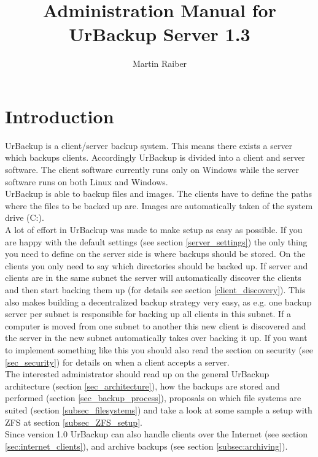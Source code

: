 \documentclass[a4paper,10pt]{article}
\begin{document}

\author{Martin Raiber}
\title{Administration Manual for\\UrBackup Server 1.3}

\maketitle

\tableofcontents

\section{Introduction}

UrBackup is a client/server backup system. This means there exists a server
which backups clients. Accordingly UrBackup is divided into a client and server
software. The client software currently runs only on Windows while the server
software runs on both Linux and Windows.\\
UrBackup is able to backup files and images. The clients have to define the
paths where the files to be backed up are. Images are automatically taken of the
system drive (C:).\\
A lot of effort in UrBackup was made to make setup as easy as possible. If you
are happy with the default settings (see section \ref{server_settings}) the only
thing you need to define on the server side is where backups should be stored.
On the clients you only need to say which directories should be backed up. If
server and clients are in the same subnet the server will automatically discover
the clients and then start backing them up (for details see section
\ref{client_discovery}). This also makes building a decentralized backup
strategy very easy, as e.g. one backup server per subnet is responsible for
backing up all clients in this subnet. If a computer is moved from one subnet to
another this new client is discovered and the server in the new subnet
automatically takes over backing it up. If you want to implement something like
this you should also read the section on security (see \ref{sec_security}) for
details on when a client accepts a server.\\
The interested administrator should read up on the general UrBackup architecture
(section \ref{sec_architecture}), how the backups are stored and performed
(section \ref{sec_backup_process}), proposals on which file systems are suited
(section \ref{subsec_filesystems}) and take a look at some sample a setup with
ZFS at section \ref{subsec_ZFS_setup}.\\
Since version 1.0 UrBackup can also handle clients over the Internet (see section
\ref{sec:internet_clients}), and archive backups (see section \ref{subsec:archiving}).
\end{document}
